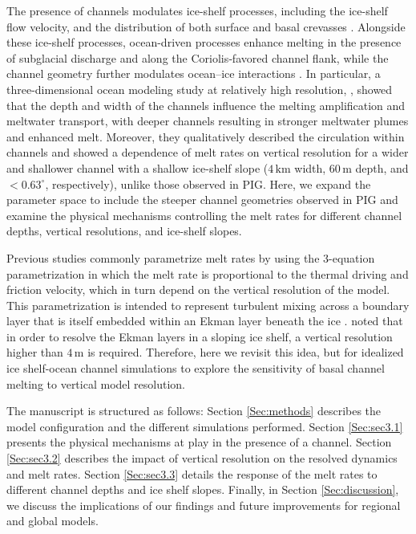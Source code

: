 \documentclass[draft]{agujournal2019}
\begin{document}
The presence of channels modulates ice-shelf processes, including the ice-shelf flow velocity, and the distribution of both surface and basal crevasses \citep{Lilien_MeltChannel_2025, Alley_channel_2022, Wearing_Basal_2021, Vaughan_channels_2012}. Alongside these ice-shelf processes, ocean-driven processes enhance melting in the presence of subglacial discharge and along the Coriolis‑favored channel flank, while the channel geometry further modulates ocean–ice interactions \citep{Lowery_Drivers_2026, Gladish_basal_2012, Millgate_BasalChannels_2013}. In particular, a three-dimensional ocean modeling study at relatively high resolution, \citet{Cheng_Channel_2024}, showed that the depth and width of the channels influence the melting amplification and meltwater transport, with deeper channels resulting in stronger meltwater plumes and enhanced melt. Moreover, they qualitatively described the circulation within channels and showed a dependence of melt rates on vertical resolution for a wider and shallower channel with a shallow ice-shelf slope ($4\,\mathrm{km}$ width, $60\,\mathrm{m}$ depth, and $<0.63^\circ$, respectively), unlike those observed in PIG. Here, we expand the parameter space to include the steeper channel geometries observed in PIG \citep{Lowery_PIG_2025} and examine the physical mechanisms controlling the melt rates for different channel depths, vertical resolutions, and ice-shelf slopes.

Previous studies commonly parametrize melt rates by using the 3-equation parametrization \citep{Holland_Modeling_1999} in which the melt rate is proportional to the thermal driving and friction velocity, which in turn depend on the vertical resolution of the model. This parametrization is intended to represent turbulent mixing across a boundary layer that is itself embedded within an Ekman layer beneath the ice \citep{Anselin_IceBase_2024, Vreugdenhil_Ocean_2022, Holland_Modeling_1999}. \citet{Patmore_Turbulence_2023} noted that in order to resolve the Ekman layers in a sloping ice shelf, a vertical resolution higher than $4\,\mathrm{m}$ is required. Therefore, here we revisit this idea, but for idealized ice shelf-ocean channel simulations to explore the sensitivity of basal channel melting to vertical model resolution. 

The manuscript is structured as follows: Section \ref{Sec:methods} describes the model configuration and the different simulations performed. Section \ref{Sec:sec3.1} presents the physical mechanisms at play in the presence of a channel. Section \ref{Sec:sec3.2} describes the impact of vertical resolution on the resolved dynamics and melt rates. Section \ref{Sec:sec3.3} details the response of the melt rates to different channel depths and ice shelf slopes. Finally, in Section \ref{Sec:discussion}, we discuss the implications of our findings and future improvements for regional and global models.
\end{document}
